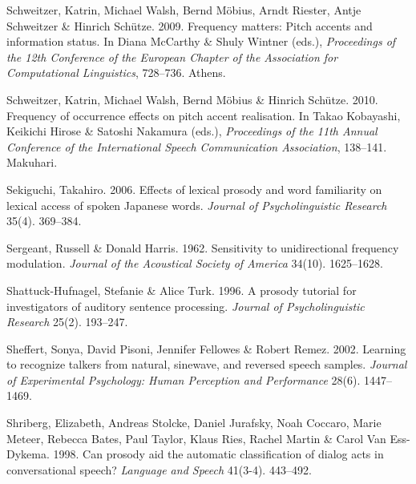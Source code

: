 \documentclass[ number=1
,series=labphon
,output=long
,url=http://langsci-press.org/catalog/book/16
,isbn=978-3-944675-01-5
]{LSP/langsci}
\begin{document}
\begin{thebibliography}{284}
Schweitzer, Katrin, Michael Walsh, Bernd M{\"o}bius, Arndt Riester, Antje
  Schweitzer \& Hinrich Sch{\"u}tze. 2009.
\newblock Frequency matters: {P}itch accents and information status.
\newblock In Diana McCarthy \& Shuly Wintner (eds.), \emph{Proceedings of the
  12th {Conference of the European Chapter of the Association for Computational
  Linguistics}}, 728--736. Athens.

Schweitzer, Katrin, Michael Walsh, Bernd M{\"o}bius \& Hinrich Sch{\"u}tze.
  2010{}.
\newblock Frequency of occurrence effects on pitch accent realisation.
\newblock In Takao Kobayashi, Keikichi Hirose \& Satoshi Nakamura (eds.),
  \emph{Proceedings of the 11th {Annual Conference of the International Speech
  Communication Association}}, 138--141. Makuhari.

Sekiguchi, Takahiro. 2006.
\newblock Effects of lexical prosody and word familiarity on lexical access of
  spoken {J}apanese words.
\newblock \emph{Journal of Psycholinguistic Research} 35(4). 369--384.

Sergeant, Russell \& Donald Harris. 1962.
\newblock Sensitivity to unidirectional frequency modulation.
\newblock \emph{Journal of the Acoustical Society of America} 34(10).
  1625--1628.

Shattuck-Hufnagel, Stefanie \& Alice Turk. 1996.
\newblock A prosody tutorial for investigators of auditory sentence processing.
\newblock \emph{Journal of Psycholinguistic Research} 25(2). 193--247.

Sheffert, Sonya, David Pisoni, Jennifer Fellowes \& Robert Remez. 2002.
\newblock Learning to recognize talkers from natural, sinewave, and reversed
  speech samples.
\newblock \emph{Journal of Experimental Psychology: Human Perception and
  Performance} 28(6). 1447--1469.

Shriberg, Elizabeth, Andreas Stolcke, Daniel Jurafsky, Noah Coccaro, Marie
  Meteer, Rebecca Bates, Paul Taylor, Klaus Ries, Rachel Martin \& Carol Van
  Ess-Dykema. 1998.
\newblock Can prosody aid the automatic classification of dialog acts in
  conversational speech?
\newblock \emph{Language and Speech} 41(3-4). 443--492.


\end{thebibliography}
\end{document}
